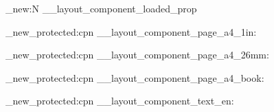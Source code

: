 
\ExplSyntaxOn

\prop_new:N \g__layout_component_loaded_prop
\providecommand{\NextBeamerRegisterSection}[2]{}

\makeatletter

\newcommand{\NextLayoutHeadFancyChapter}{
  \RequirePackage{fancyhdr}
  \providecommand{\HeaderTitle}{}
  \pagestyle{fancy}
  \fancyhf{}
  \renewcommand{\chaptermark}[1]{\markboth{##1}{}}
  \renewcommand{\sectionmark}[1]{}
  \renewcommand{\subsectionmark}[1]{}
  \renewcommand{\subsubsectionmark}[1]{}
  \if@twoside
    \fancyhead[LE]{\small\thepage}
    \fancyhead[RE]{\itshape\small\HeaderTitle}
    \fancyhead[LO]{\itshape\small\leftmark}
    \fancyhead[RO]{\small\thepage}
  \else
    \fancyhead[L]{\itshape\small\HeaderTitle}
    \fancyhead[R]{\small\thepage}
  \fi
  \renewcommand{\headrulewidth}{0.4pt}
  \renewcommand{\footrulewidth}{0pt}
  \setlength{\headheight}{14pt}
  \fancypagestyle{plain}{
    \fancyhf{}
    \renewcommand{\headrulewidth}{0pt}
    \renewcommand{\footrulewidth}{0pt}
  }
}

\newcommand{\NextLayoutBookOpenRight}{
  \@openrighttrue
}

\newcommand{\NextLayoutBookBlankPageEmpty}{
  \renewcommand{\cleardoublepage}{
    \clearpage
    \if@twoside
      \ifodd\c@page
      \else
        \hbox{}
        \thispagestyle{empty}
        \newpage
        \if@twocolumn
          \hbox{}
          \newpage
        \fi
      \fi
    \fi
  }
}

\makeatother

\cs_new_protected:cpn { __layout_component_page_a4_1in: }
  { \RequirePackage[a4paper,margin=1in]{geometry} }

\cs_new_protected:cpn { __layout_component_page_a4_26mm: }
  { \RequirePackage[a4paper,margin=2.6cm]{geometry} }

\cs_new_protected:cpn { __layout_component_page_a4_book: }
  {
    \RequirePackage[
      a4paper,
      twoside,
      inner=3.2cm,
      outer=2.4cm,
      top=2.6cm,
      bottom=2.6cm,
      bindingoffset=0.4cm
    ]{geometry}
  }

\cs_new_protected:cpn { __layout_component_text_en: }
  {
    \RequirePackage{setspace}
    \setlength{\parindent}{15pt}
    \setlength{\parskip}{0pt}
  }

